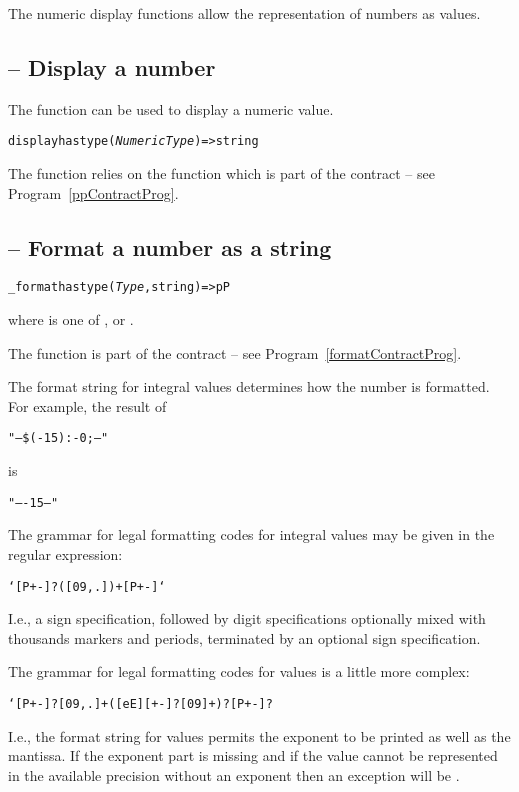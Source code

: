 The numeric display functions allow the representation of numbers as  values.

\subsection{ -- Display a number}
\label{displayNumFun}

The  function can be used to display a numeric value.
\begin{alltt}
display has type (\emph{NumericType})=>string
\end{alltt}
The  function relies on the  function which is part of the  contract -- see Program~\vref{ppContractProg}.

\subsection{ -- Format a number as a string}
\label{formatNumber}
\begin{alltt}
\_format has type (\emph{Type},string)=>pP
\end{alltt}
where  is one of ,  or .

The  function is part of the  contract -- see Program~\vref{formatContractProg}.

The format string for integral values determines how the number is formatted. For example, the result of
\begin{alltt}
"--\$(-15):-   0;--"
\end{alltt}
is
\begin{alltt}
"--  -15--"
\end{alltt}

The grammar for legal formatting codes for integral values may be given in the regular expression:
\begin{alltt}
`[P+-]?([09 ,.])+[P+-]`
\end{alltt}
I.e., a sign specification, followed by digit specifications optionally mixed with thousands markers and periods, terminated by an optional sign specification.

The grammar for legal formatting codes for  values is a little more complex:
\begin{alltt}
`[P+-]?[09 ,.]+([eE][+-]?[09 ]+)?[P+-]?
\end{alltt}
I.e., the format string for  values permits the exponent to be printed as well as the mantissa. If the exponent part is missing and if the  value cannot be represented in the available precision without an exponent then an exception will be .

